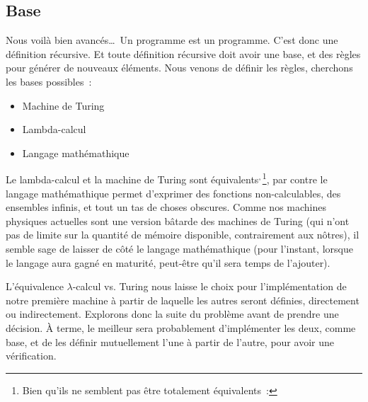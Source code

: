 \documentclass{article}
\begin{document}
\subsection{Base}

Nous voilà bien avancés\dots\ Un programme est un programme. C'est donc une définition récursive. Et toute définition récursive doit avoir une base, et des règles pour générer de nouveaux éléments. Nous venons de définir les règles, cherchons les bases possibles~:
\begin{itemize}
\item Machine de Turing
\item Lambda-calcul
\item Langage mathémathique
\end{itemize}

Le lambda-calcul et la machine de Turing sont
équivalents\cite{lambda-calculus-wikipedia}$\vphantom{X}^{,}$\footnote{Bien qu'ils ne
  semblent pas être totalement équivalents\cite{lambda-turing-equivalence}~: },
par contre le langage mathémathique permet d'exprimer des fonctions non-calculables, des ensembles infinis, et tout un tas de choses
obscures. Comme nos machines physiques actuelles sont une version bâtarde des machines de Turing (qui n'ont pas de limite sur la quantité de
mémoire disponible, contrairement aux nôtres), il semble sage de laisser de côté le langage mathémathique (pour l'instant, lorsque le
langage aura gagné en maturité, peut-être qu'il sera temps de l'ajouter).

L'équivalence $\lambda$-calcul vs. Turing nous laisse le choix pour l'implémentation de notre première machine à partir de laquelle les autres seront définies, directement ou indirectement. Explorons donc la suite du problème avant de prendre une décision. À terme, le meilleur sera probablement d'implémenter les deux, comme base, et de les définir mutuellement l'une à partir de l'autre, pour avoir une vérification.
\end{document}
